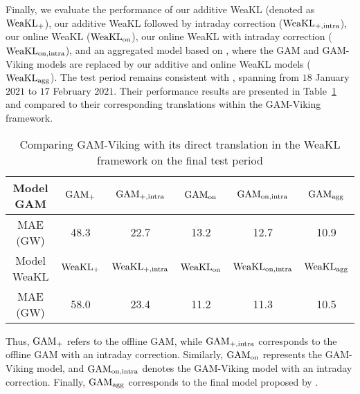 Finally, we evaluate the performance of our additive WeaKL (denoted as $\hbox{WeaKL}_{\mathrm{+}}$), our additive WeaKL followed by intraday correction ($\hbox{WeaKL}_{+,\mathrm{intra}}$), our online WeaKL ($\hbox{WeaKL}_{\mathrm{on}}$), our online WeaKL with intraday correction ($\hbox{WeaKL}_{\mathrm{on, intra}}$), and an aggregated model based on \citet{vilmarest2022state}, where the GAM and GAM-Viking models are replaced by our additive and online WeaKL models ($\hbox{WeaKL}_{\mathrm{agg}}$). The test period remains consistent with \citet{vilmarest2022state}, spanning from $18$ January $2021$ to $17$ February $2021$. Their performance results are presented in Table~\ref{tab:gam-vik} and compared to their corresponding translations within the GAM-Viking framework.
\begin{table}
    \centering
    \caption{Comparing GAM-Viking with its direct translation in the WeaKL framework on the final test period}
    \begin{tabular}{|c|ccccc|}
        \hline
        Model GAM &  $\hbox{GAM}_{\mathrm{+}}$ & $\hbox{GAM}_{+,\mathrm{intra}}$ & $\hbox{GAM}_{\mathrm{on}}$ & $\hbox{GAM}_{\mathrm{on, intra}}$ & $\hbox{GAM}_{\mathrm{agg}}$\\
        \hline
         MAE (GW) & 48.3 & 22.7 & 13.2 & 12.7 & 10.9\\
         \hline
         \hline
        Model WeaKL &  $\hbox{WeaKL}_{\mathrm{+}}$ & $\hbox{WeaKL}_{+,\mathrm{intra}}$ & $\hbox{WeaKL}_{\mathrm{on}}$ & $\hbox{WeaKL}_{\mathrm{on, intra}}$ & $\hbox{WeaKL}_{\mathrm{agg}}$\\
        \hline
         MAE (GW) & 58.0 & 23.4 & 11.2 & 11.3 & 10.5\\
         \hline
    \end{tabular}
    \label{tab:gam-vik}
\end{table}
Thus, $\hbox{GAM}_{\mathrm{+}}$ refers to the offline GAM, while $\hbox{GAM}_{+,\mathrm{intra}}$ corresponds to the offline GAM with an intraday correction. Similarly, $\hbox{GAM}_{\mathrm{on}}$ represents the GAM-Viking model, and $\hbox{GAM}_{\mathrm{on, intra}}$ denotes the GAM-Viking model with an intraday correction. Finally, $\hbox{GAM}_{\mathrm{agg}}$ corresponds to the final model proposed by \citet{vilmarest2022state}.

